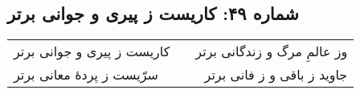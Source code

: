 \begin{center}
\section*{شماره ۴۹: کاریست ز پیری و جوانی برتر}
\label{sec:049}
\begin{longtable}{l p{0.5cm} r}
کاریست ز پیری و جوانی برتر
&&
وز عالمِ مرگ و زندگانی برتر
\\
سرّیست ز پردهٔ معانی برتر
&&
جاوید ز باقی و ز فانی برتر
\\
\end{longtable}
\end{center}
